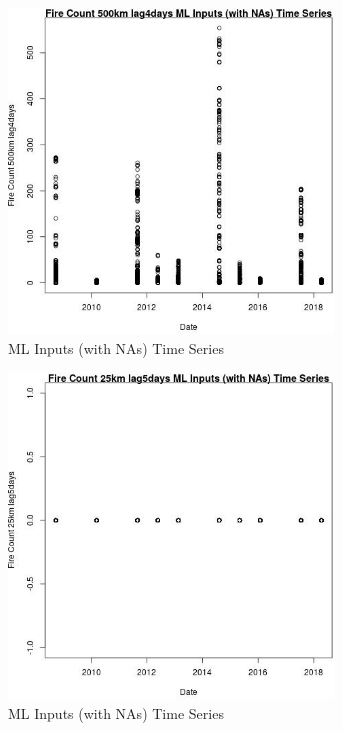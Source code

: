 \begin{figure} 
\centering  
\includegraphics[width=0.77\textwidth]{Code_Outputs/Report_ML_input_PM25_Step4_part_e_de_duplicated_aves_compiled_2019-05-18wNAs_Fire_Count_500km_lag4daysvDate.jpg} 
\caption{\label{fig:Report_ML_input_PM25_Step4_part_e_de_duplicated_aves_compiled_2019-05-18wNAsFire_Count_500km_lag4daysvDate}ML Inputs (with NAs) Time Series} 
\end{figure} 
 

\begin{figure} 
\centering  
\includegraphics[width=0.77\textwidth]{Code_Outputs/Report_ML_input_PM25_Step4_part_e_de_duplicated_aves_compiled_2019-05-18wNAs_Fire_Count_25km_lag5daysvDate.jpg} 
\caption{\label{fig:Report_ML_input_PM25_Step4_part_e_de_duplicated_aves_compiled_2019-05-18wNAsFire_Count_25km_lag5daysvDate}ML Inputs (with NAs) Time Series} 
\end{figure} 
 

